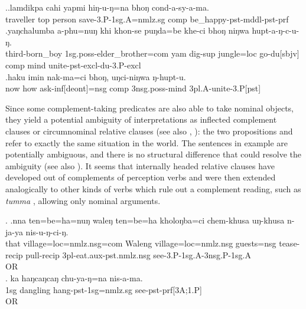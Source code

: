  
\ex.\ag.lamdikpa  cahi yapmi  hiŋ-u-ŋ=na       bhoŋ cond-a-sy-a-ma.\\
traveller {\sc top} person save{\sc [pst]-3.P-1sg.A=nmlz.sg} {\sc comp} be\_happy{\sc [3sg]-pst-mddl-pst-prf}\\
 
\bg.yaŋchalumba   a-phu=nuŋ                      khi khon-se         puŋda=be    khe-ci   bhoŋ niŋwa hupt-a-ŋ-c-u-ŋ.\\
third-born\_boy {\sc 1sg.poss-}elder\_brother{\sc =com} yam dig{\sc -sup} jungle{\sc =loc} go{\sc -du[sbjv]} {\sc comp} mind unite{\sc -pst-excl-du-3.P-excl}\\
\bg.haku imin nak-ma=ci                  bhoŋ, uŋci-niŋwa       ŋ-hupt-u.\\
now how ask{\sc -inf[deont]=nsg} {\sc comp} {\sc 3nsg.poss-}mind {\sc 3pl.A-}unite{\sc -3.P[pst]}\\
 


Since some complement-taking predicates are also able to take nominal objects,  they yield a potential ambiguity of interpretations as inflected  complement clauses or circumnominal relative clauses (see also \citet[272]{Bickel1999Nominalization}, \citealt[120, 143]{Noonan2007Complementation}): the two propositions  and  refer to exactly the same situation in the world. The sentences in example \Next are potentially ambiguous, and there is no structural difference that could resolve the ambiguity (see also ). It seems that internally headed relative clauses have developed out of complements of perception verbs and were then extended analogically to other kinds of verbs which rule out a complement reading, such as \emph{tumma} , allowing only nominal arguments.

\ex. \ag.nna  ten=be=ha=nuŋ waleŋ    ten=be=ha    kholoŋba=ci    chem-khusa    uŋ-khusa    n-ja-ya    nis-u-ŋ-ci-ŋ.\\
that village{\sc =loc=nmlz.nsg=com} Waleng village{\sc =loc=nmlz.nsg} guests{\sc =nsg} tease{\sc -recip} pull{\sc -recip} {\sc 3pl-eat.aux-pst.nmlz.nsg} see{\sc [pst]-3.P-1sg.A-3nsg.P-1sg.A}\\
 OR\\
 
\bg.  ka  haŋcaŋcaŋ chu-ya-ŋ=na                  nis-a-ma.\\
{\sc 1sg} dangling hang{\sc -pst-1sg=nmlz.sg} see{\sc -pst-prf[3A;1.P]}\\
 OR \\
 


